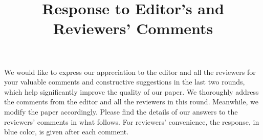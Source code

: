 \documentclass[12ptm]{article}
\begin{document}
\title{Response to Editor's and Reviewers' Comments}
\author{}

\maketitle
{\large
We would like to express our appreciation to the editor and all the reviewers for your valuable comments and constructive suggestions in the last two rounds, which help significantly improve the quality of our paper. We thoroughly address the comments from the editor and all the reviewers in this round. Meanwhile, we modify the paper accordingly. Please find the details of our answers to the reviewers' comments in what follows. For reviewers' convenience, the response, in blue color, is given after each comment.
}



\newpage


\newpage


\newpage

\end{document}
